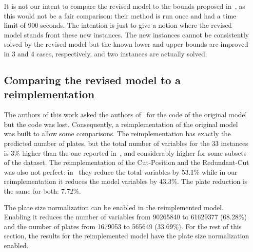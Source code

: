 \documentclass[runningheads]{llncs}
\begin{document}
It is not our intent to compare the revised model to the bounds proposed in~\cite{velasco}, as this would not be a fair comparison: their method is run once and had a time limit of 900 seconds.
The intention is just to give a notion where the revised model stands front these new instances.
The new instances cannot be consistently solved by the revised model but the known lower and upper bounds are improved in 3 and 4 cases, respectively, and two instances are actually solved.


\subsection{Comparing the revised model to a reimplementation}

The authors of this work asked the authors of~\cite{furini:2016} for the code of the original model but the code was lost.
Consequently, a reimplementation of the original model was built to allow some comparisons.
The reimplementation has exactly the predicted number of plates, but the total number of variables for the 33 instances is 3\% higher than the one reported in~\cite{furini:2016}, and considerably higher for some subsets of the dataset.
The reimplementation of the Cut-Position and the Redundant-Cut was also not perfect: in~\cite{dimitri} they reduce the total variables by 53.1\% while in our reimplementation it reduces the model variables by 43.3\%.
The plate reduction is the same for both: 7.72\%.

The plate size normalization can be enabled in the reimplemented model.
Enabling it reduces the number of variables from 90265840 to 61629377 (68.28\%) and the number of plates from 1679053 to 565649 (33.69\%).
For the rest of this section, the results for the reimplemented model have the plate size normalization enabled.
\end{document}
